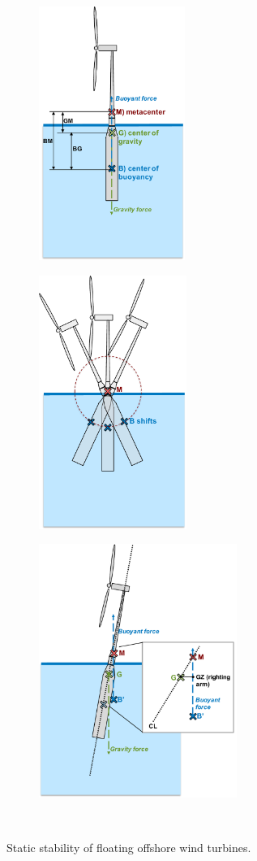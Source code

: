 \begin{figure}
  \begin{subfigure}[b]{0.29\linewidth}
    \centering \includegraphics[height=3.25in]{figs/metacenterA.pdf}
    \caption{}
  \end{subfigure}
  \begin{subfigure}[b]{0.29\linewidth}
    \centering \includegraphics[height=3.25in]{figs/metacenterC.pdf}
    \caption{}
  \end{subfigure}
  \begin{subfigure}[b]{0.4\linewidth}
    \centering \includegraphics[height=3.25in]{figs/metacenterD.pdf}
    \caption{}
  \end{subfigure}\\
  \caption{Static stability of floating offshore wind turbines.}
  \label{fig:metacenter}
\end{figure}

